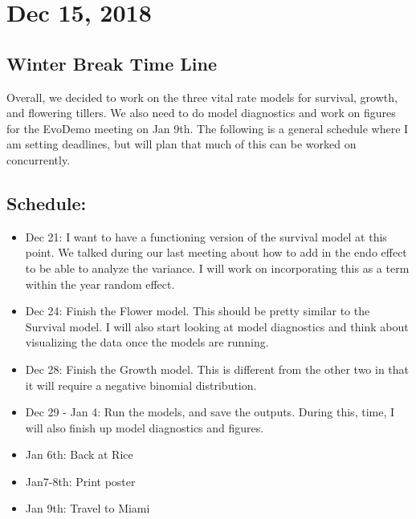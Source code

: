 \documentclass{article}
\newcommand{\tom}[1]{{\textit{\color{WildStrawberry}{[#1]}}}}
\begin{document}
\section*{Dec 15, 2018}
\subsection*{Winter Break Time Line}
Overall, we decided to work on the three vital rate models for survival, growth, and flowering tillers. We also need to do model diagnostics and work on figures for the EvoDemo meeting on Jan 9th. The following is a general schedule where I am setting deadlines, but will plan that much of this can be worked on concurrently.

\subsection*{Schedule:}
\begin{itemize}
\item{Dec 21: I want to have a functioning version of the survival model at this point. We talked during our last meeting about how to add in the endo effect to be able to analyze the variance. I will work on incorporating this as a term within the year random effect. \tom{I think there are two ways of doing this. The way that we wrote out would have E+ and E- plants having different temporal distributions on the intercept values. A second way would be to put a temporal distribution on an endophyte effect parameter. These would be equivalent models that use a different parameterization, essentially a `mean parameterization' versus an `effect parameterization'. For now, proceed with whatever makes the most sense to you and we can discuss.}}
\item{Dec 24: Finish the Flower model. This should be pretty similar to the Survival model. I will also start looking at model diagnostics and think about visualizing the data once the models are running.\tom{Yes, flowering will be easy once you do survival.}} 
\item{Dec 28: Finish the Growth model. This is different from the other two in that it will require a negative binomial distribution.\tom{Yes, there are several ways to parameterize a NB. The easiest (and hackiest) way to do this would be to use a Poisson model but add an individual-level random effect. This basically adds overdispersion, which allows the Poisson to approximate the NB. Also remember that this will need to be zero-truncated. This is easy to do in BUGS, not sure about Stan (google it).}}
\item{Dec 29 - Jan 4: Run the models, and save the outputs. During this, time, I will also finish up model diagnostics and figures.}
\item{Jan 6th: Back at Rice\tom{Let's schedule a meeting first thing when you are back, so you can show me what should basically be all the raw materials for your poster.}}
\item{Jan7-8th: Print poster}
\item{Jan 9th: Travel to Miami}
\end{itemize}
\end{document}
